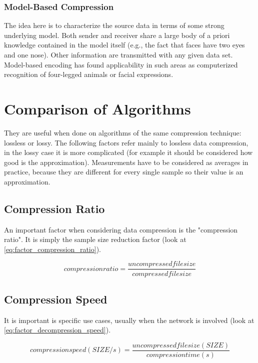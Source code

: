 \documentclass[12pt, a4paper]{report}
\begin{document}
\subsubsection{Model-Based Compression}

The idea here is to characterize the source data in terms of some strong underlying model.
Both sender and receiver share a large body of a priori knowledge contained in the model itself (e.g., the fact that faces have
two eyes and one nose).
Other information are transmitted with any given data set.
Model-based encoding has found applicability in such areas as computerized recognition of four-legged animals or facial
expressions.

\section{Comparison of Algorithms}

They are useful when done on algorithms of the same compression technique: lossless or lossy.
The following factors refer mainly to lossless data compression, in the lossy case it is more complicated (for example it should
be considered how good is the approximation).
Measurements have to be considered as averages in practice, because they are different for every single sample so their value is
an approximation.

\subsection{Compression Ratio}

An important factor when considering data compression is the "compression ratio". It is simply the sample size reduction factor
(look at \autoref{eq:factor_compression_ratio}).

\begin{equation} \label{eq:factor_compression_ratio}
  compression ratio = \frac{uncompressed file size}{compressed file size}
\end{equation}

\subsection{Compression Speed}

It is important is specific use cases, usually when the network is involved (look at \autoref{eq:factor_decompression_speed}).

\begin{equation} \label{eq:factor_compression_speed}
  compression speed (SIZE / s) = \frac{uncompressed file size (SIZE)}{compression time (s)}
\end{equation}
\end{document}
